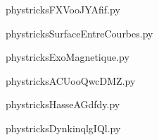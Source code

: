 
    \newcommand{\CaptionFigFXVooJYAfif}{<+Type your caption here+>}
    \begin{center}
        
    \end{center}
    phystricksFXVooJYAfif.py

    

    \clearpage
    


    \newcommand{\CaptionFigSurfaceEntreCourbes}{<+Type your caption here+>}
    \begin{center}
        
    \end{center}
    phystricksSurfaceEntreCourbes.py

    

    \clearpage
    


    \newcommand{\CaptionFigExoMagnetique}{<+Type your caption here+>}
    \begin{center}
        
    \end{center}
    phystricksExoMagnetique.py

    

    \clearpage
    


    \newcommand{\CaptionFigACUooQwcDMZ}{<+Type your caption here+>}
    \begin{center}
        
    \end{center}
    phystricksACUooQwcDMZ.py

    

    \clearpage
    


    \newcommand{\CaptionFigHasseAGdfdy}{<+Type your caption here+>}
    \begin{center}
        
    \end{center}
    phystricksHasseAGdfdy.py

    

    \clearpage
    


    \newcommand{\CaptionFigDynkinqlgIQl}{<+Type your caption here+>}
    \begin{center}
        
    \end{center}
    phystricksDynkinqlgIQl.py

